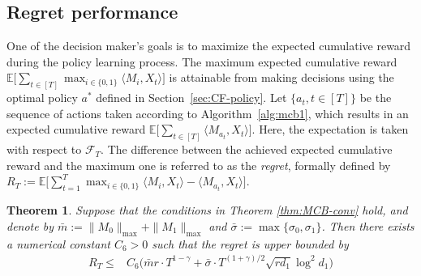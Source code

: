\documentclass[12pt]{article}
\newcommand{\inp}[2]{\langle #1,#2\rangle}
\def\calF{{\mathcal F}}
\def\EE{{\mathbb E}}
\def\hat{\widehat}
\def\eps{\varepsilon}
\newtheorem{Theorem}{Theorem}
\theoremstyle{plain}
\begin{document}
\subsection{Regret performance} \label{sec:regret}
One of the decision maker's goals is to maximize the expected cumulative reward during the policy learning process. The maximum expected cumulative reward $\EE\big[\sum_{t\in[T]}\max_{i\in\{0,1\}}\langle M_i, X_t \rangle\big]$ is attainable from making decisions using the optimal policy $a^{\ast}$ defined in Section~\ref{sec:CF-policy}. Let $\{a_t, t\in[T]\}$ be the sequence of actions taken according to Algorithm~\ref{alg:mcb1}, which results in an expected cumulative reward $\EE\big[\sum_{t\in[T]} \langle M_{a_t}, X_t\rangle\big]$.  Here,  the expectation is taken with respect to $\calF_T$. 
The difference between the achieved expected cumulative reward and the maximum one is referred to as the \emph{regret}, formally defined by
$ R_T:=\EE\big[\sum_{t=1}^{T} \max_{i\in \{0,1\}}\inp{M_i}{X_t} - \inp{M_{a_t}}{X_t}\big].$




\begin{Theorem} \label{thm:regret}
  Suppose that  the conditions in Theorem \ref{thm:MCB-conv} hold, and denote by $\bar{m}:=\|M_0\|_{\max}+\|M_1\|_{\max}$ and $\bar\sigma:=\max\{\sigma_0, \sigma_1\}$. 
  Then there exists a numerical constant $C_6>0$ such that  the regret is upper bounded by 
\begin{align*}
        R_T\leq & C_6\bigg(\bar m r\cdot T^{1-\gamma}+\bar\sigma\cdot T^{(1+\gamma)/2}\sqrt{rd_1}\log^2 d_1 \bigg)
 \end{align*}
\end{Theorem}
\end{document}
